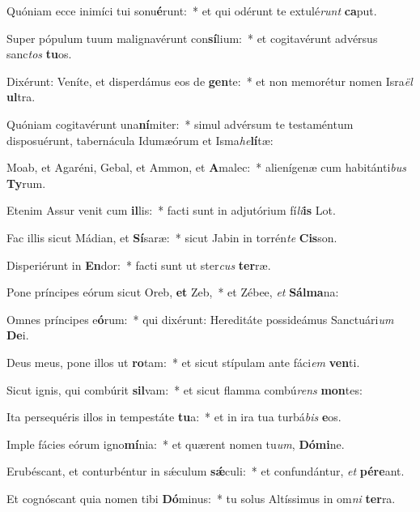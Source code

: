 \item Quóniam ecce inimíci tui sonu\textbf{é}runt:~* et qui odérunt te extulé\textit{runt} \textbf{ca}put.
\item Super pópulum tuum malignavérunt con\textbf{sí}lium:~* et cogitavérunt advérsus sanc\textit{tos} \textbf{tu}os.
\item Dixérunt: Veníte, et disperdámus eos de \textbf{gen}te:~* et non memorétur nomen Isra\textit{ël} \textbf{ul}tra.
\item Quóniam cogitavérunt una\textbf{ní}miter:~* simul advérsum te testaméntum disposuérunt, tabernácula Idumæórum et Isma\textit{he}\textbf{lí}tæ:
\item Moab, et Agaréni, Gebal, et Ammon, et \textbf{A}malec:~* alienígenæ cum habitánti\textit{bus} \textbf{Ty}rum.
\item Etenim Assur venit cum \textbf{il}lis:~* facti sunt in adjutórium fí\textit{li}\textbf{is} Lot.
\item Fac illis sicut Mádian, et \textbf{Sí}saræ:~* sicut Jabin in torrén\textit{te} \textbf{Cis}son.
\item Disperiérunt in \textbf{En}dor:~* facti sunt ut ster\textit{cus} \textbf{ter}ræ.
\item Pone príncipes eórum sicut Oreb, \textbf{et} Zeb,~* et Zébee, \textit{et} \textbf{Sál}\textbf{ma}na:
\item Omnes príncipes e\textbf{ó}rum:~* qui dixérunt: Hereditáte possideámus Sanctuári\textit{um} \textbf{De}i.
\item Deus meus, pone illos ut \textbf{ro}tam:~* et sicut stípulam ante fáci\textit{em} \textbf{ven}ti.
\item Sicut ignis, qui combúrit \textbf{sil}vam:~* et sicut flamma combú\textit{rens} \textbf{mon}tes:
\item Ita persequéris illos in tempestáte \textbf{tu}a:~* et in ira tua turbá\textit{bis} \textbf{e}os.
\item Imple fácies eórum igno\textbf{mí}nia:~* et quærent nomen tu\textit{um}, \textbf{Dó}\textbf{mi}ne.
\item Erubéscant, et conturbéntur in sǽculum \textbf{sǽ}culi:~* et confundántur, \textit{et} \textbf{pér}\textbf{e}ant.
\item Et cognóscant quia nomen tibi \textbf{Dó}minus:~* tu solus Altíssimus in om\textit{ni} \textbf{ter}ra.
